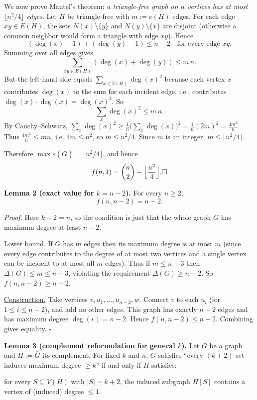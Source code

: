 We now prove Mantel's theorem:
\emph{a triangle-free graph on $n$ vertices has at most $\lfloor n^2/4\rfloor$
edges}.
Let $H$ be triangle-free with $m:=e(H)$ edges. For each edge $xy\in E(H)$, the sets
$N(x)\setminus\{y\}$ and $N(y)\setminus\{x\}$ are disjoint (otherwise a common
neighbor would form a triangle with edge $xy$).
Hence
\[
(\deg(x)-1)+(\deg(y)-1) \le n-2\quad\text{for every edge }xy.
\]
Summing over all edges gives
\[
\sum_{xy\in E(H)} (\deg(x)+\deg(y)) \le m\,n.
\]
But the left-hand side equals $\sum_{x\in V(H)} \deg(x)^2$ because each vertex $x$
contributes $\deg(x)$ to the sum for each incident edge, i.e., contributes
$\deg(x)\cdot \deg(x)=\deg(x)^2$.
So
\[
\sum_{x} \deg(x)^2 \le m\,n.
\]
By Cauchy--Schwarz,
$\sum_x \deg(x)^2 \ge \frac{1}{n}\bigl(\sum_x \deg(x)\bigr)^2
=\frac{1}{n}(2m)^2=\frac{4m^2}{n}$.
Thus $\frac{4m^2}{n}\le mn$, i.e. $4m\le n^2$, so $m\le n^2/4$.
Since $m$ is an integer, $m\le \lfloor n^2/4\rfloor$.

Therefore $\max e(\overline{G}) = \lfloor n^2/4\rfloor$, and hence
\[
 f(n,1)=\binom{n}{2}-\Bigl\lfloor\frac{n^2}{4}\Bigr\rfloor.
\hfill \square
\]

\medskip
\textbf{Lemma 2 (exact value for $k=n-2$).}
For every $n\ge2$,
\[
 f(n,n-2)=n-2.
\]

\emph{Proof.}
Here $k+2=n$, so the condition is just that the whole graph $G$ has
maximum degree at least $n-2$.

\underline{Lower bound.}
If $G$ has $m$ edges then its maximum degree is at most $m$ (since every edge
contributes to the degree of at most two vertices and a single vertex can be
incident to at most all $m$ edges). Thus if $m\le n-3$ then
$\Delta(G)\le m\le n-3$, violating the requirement $\Delta(G)\ge n-2$.
So $f(n,n-2)\ge n-2$.

\underline{Construction.}
Take vertices $v,u_1,\dots,u_{n-2},w$.
Connect $v$ to each $u_i$ (for $1\le i\le n-2$), and add no other edges.
This graph has exactly $n-2$ edges and has maximum degree $\deg(v)=n-2$.
Hence $f(n,n-2)\le n-2$.
Combining gives equality.
\hfill $\square$

\medskip
\textbf{Lemma 3 (complement reformulation for general $k$).}
Let $G$ be a graph and $H:=\overline{G}$ its complement.
For fixed $k$ and $n$, $G$ satisfies
``every $(k+2)$-set induces maximum degree $\ge k$''
if and only if $H$ satisfies:

\medskip
\noindent for every $S\subseteq V(H)$ with $|S|=k+2$, the induced subgraph $H[S]$
contains a vertex of (induced) degree $\le 1$.

